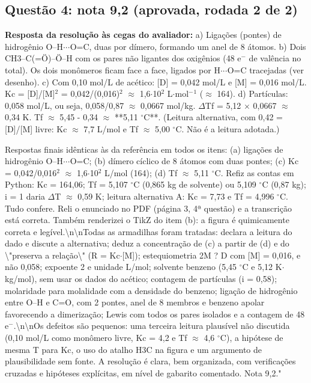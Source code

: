 \documentclass{article}%
\begin{document}
\subsection*{Questão 4: nota 9,2 (aprovada, rodada 2 de 2)}%
\textbf{Resposta da resolução às cegas do avaliador:} a) Ligações (pontes) de hidrogênio O--H$\cdot$$\cdot$$\cdot$O=C, duas por dímero, formando um anel de 8 átomos.\newline%
\newline%
b) Dois CH3--C(=Ö)--Ö--H com os pares não ligantes dos oxigênios (48 e$^{-}$ de valência no total). Os dois monômeros ficam face a face, ligados por H$\cdot$$\cdot$$\cdot$O=C tracejadas (ver desenho).\newline%
\newline%
c) Com 0,10 mol/L de acético: {[}D{]} = 0,042 mol/L e {[}M{]} = 0,016 mol/L. Kc = {[}D{]}/{[}M{]}$^2$ = 0,042/(0,016)$^2$ $\approx$ 1,6$\cdot$10$^2$ L$\cdot$mol$^{-}$$^{1}$ ($\approx$ 164).\newline%
\newline%
d) Partículas: 0,058 mol/L, ou seja, 0,058/0,87 $\approx$ 0,0667 mol/kg. $\Delta$Tf = 5,12 $\times$ 0,0667 $\approx$ 0,34 K. Tf $\approx$ 5,45 - 0,34 $\approx$ **5,11 $^\circ$C**.\newline%
\newline%
(Leitura alternativa, com 0,42 = {[}D{]}/{[}M{]} livre: Kc $\approx$ 7,7 L/mol e Tf $\approx$ 5,00 $^\circ$C. Não é a leitura adotada.)\par %
Respostas finais idênticas às da referência em todos os itens: (a) ligações de hidrogênio O--H$\cdot$$\cdot$$\cdot$O=C; (b) dímero cíclico de 8 átomos com duas pontes; (c) Kc = 0,042/0,016$^2$ $\approx$ 1,6$\cdot$10$^2$ L/mol (164); (d) Tf $\approx$ 5,11 $^\circ$C. Refiz as contas em Python: Kc = 164,06; Tf = 5,107 $^\circ$C (0,865 kg de solvente) ou 5,109 $^\circ$C (0,87 kg); i = 1 daria $\Delta$T $\approx$ 0,59 K; leitura alternativa A: Kc = 7,73 e Tf = 4,996 $^\circ$C. Tudo confere. Reli o enunciado no PDF (página 3, 4ª questão) e a transcrição está correta. Também renderizei o TikZ do item (b): a figura é quimicamente correta e legível.\textbackslash{}n\textbackslash{}nTodas as armadilhas foram tratadas: declara a leitura do dado e discute a alternativa; deduz a concentração de (c) a partir de (d) e do \textbackslash{}"preserva a relação\textbackslash{}" (R = Kc$\cdot${[}M{]}); estequiometria 2M ? D com {[}M{]} = 0,016, e não 0,058; expoente 2 e unidade L/mol; solvente benzeno (5,45 $^\circ$C e 5,12 K$\cdot$kg/mol), sem usar os dados do acético; contagem de partículas (i = 0,58); molaridade para molalidade com a densidade do benzeno; ligação de hidrogênio entre O--H e C=O, com 2 pontes, anel de 8 membros e benzeno apolar favorecendo a dimerização; Lewis com todos os pares isolados e a contagem de 48 e$^{-}$.\textbackslash{}n\textbackslash{}nOs defeitos são pequenos: uma terceira leitura plausível não discutida (0,10 mol/L como monômero livre, Kc = 4,2 e Tf $\approx$ 4,6 $^\circ$C), a hipótese de mesma T para Kc, o uso do atalho H3C na figura e um argumento de plausibilidade sem fonte. A resolução é clara, bem organizada, com verificações cruzadas e hipóteses explícitas, em nível de gabarito comentado. Nota 9,2."%
$$
\end{document}
